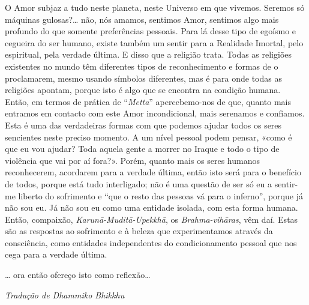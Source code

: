 O Amor subjaz a tudo neste planeta, neste Universo em que vivemos.
Seremos só máquinas gulosas?\ldots{} não, nós amamos, sentimos Amor, sentimos
algo mais profundo do que somente preferências pessoais. Para lá desse
tipo de egoísmo e cegueira do ser humano, existe também um sentir para a
Realidade Imortal, pelo espiritual, pela verdade última. E disso que a
religião trata. Todas as religiões existentes no mundo têm diferentes
tipos de reconhecimento e formas de o proclamarem, mesmo usando símbolos
diferentes, mas é para onde todas as religiões apontam, porque isto é
algo que se encontra na condição humana. Então, em termos de prática de
``\emph{Metta}'' apercebemo-nos de que, quanto mais entramos em contacto
com este Amor incondicional, mais serenamos e confiamos. Esta é uma das
verdadeiras formas com que podemos ajudar todos os seres sencientes
neste preciso momento. A um nível pessoal podem pensar, «como é que eu
vou ajudar? Toda aquela gente a morrer no Iraque e todo o tipo de
violência que vai por aí fora?». Porém, quanto mais os seres humanos
reconhecerem, acordarem para a verdade última, então isto será para o
benefício de todos, porque está tudo interligado; não é uma questão de
ser só eu a sentir-me liberto do sofrimento e ``que o resto das pessoas
vá para o inferno'', porque já não sou eu. Já não sou eu como uma
entidade isolada, com esta forma humana. Então, compaixão,
\emph{Karunā-Muditā-Upekkhā}, os \emph{Brahma-vihāras}, vêm daí. Estas
são as respostas ao sofrimento e à beleza que experimentamos através da
consciência, como entidades independentes do condicionamento pessoal que
nos cega para a verdade última.

\ldots{} ora então ofereço isto como reflexão\ldots{}

\bigskip

{\raggedleft\itshape
  Tradução de Dhammiko Bhikkhu
\par}

